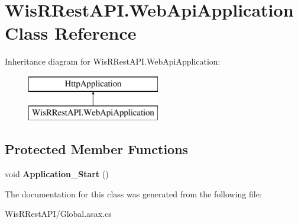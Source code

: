 \hypertarget{class_wis_r_rest_a_p_i_1_1_web_api_application}{}\section{Wis\+R\+Rest\+A\+P\+I.\+Web\+Api\+Application Class Reference}
\label{class_wis_r_rest_a_p_i_1_1_web_api_application}
Inheritance diagram for Wis\+R\+Rest\+A\+P\+I.\+Web\+Api\+Application\+:\begin{figure}[H]
\begin{center}
\leavevmode
\includegraphics[height=2.000000cm]{class_wis_r_rest_a_p_i_1_1_web_api_application}
\end{center}
\end{figure}
\subsection*{Protected Member Functions}
\begin{DoxyCompactItemize}
\item 
\hypertarget{class_wis_r_rest_a_p_i_1_1_web_api_application_a3b4038f2acade86031d362ca4ac8aaec}{}void {\bfseries Application\+\_\+\+Start} ()\label{class_wis_r_rest_a_p_i_1_1_web_api_application_a3b4038f2acade86031d362ca4ac8aaec}

\end{DoxyCompactItemize}


The documentation for this class was generated from the following file\+:\begin{DoxyCompactItemize}
\item 
Wis\+R\+Rest\+A\+P\+I/Global.\+asax.\+cs\end{DoxyCompactItemize}
